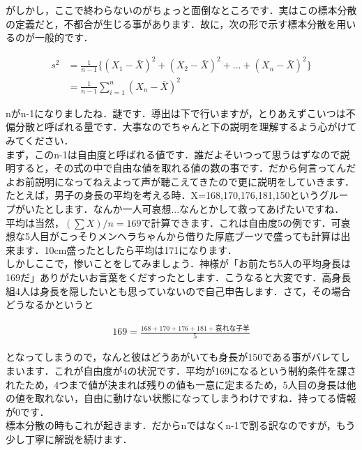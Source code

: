 \documentclass[11pt,a4paper,uplatex]{ujreport} 	%
\begin{document}
がしかし，ここで終わらないのがちょっと面倒なところです．実はこの標本分散の定義だと，不都合が生じる事があります．故に，次の形で示す標本分散を用いるのが一般的です．

\begin{align}
  s^2 &= \frac{1}{n-1}\{ (X_1-\bar{X})^2 + (X_2-\bar{X})^2 + ...+(X_n - \bar{X})^2 \}\\
      &= \frac{1}{n-1} \sum_{i=1}^n(X_n - \bar{X})^2
\end{align}

nがn-1になりましたね．謎です．導出は下で行いますが，とりあえずこいつは不偏分散と呼ばれる量です．大事なのでちゃんと下の説明を理解するよう心がけてみてください．\\

まず，このn-1は自由度と呼ばれる値です．誰だよそいつって思うはずなので説明すると，その式の中で自由な値を取れる値の数の事です．だから何言ってんだよお前説明になってねえよって声が聴こえてきたので更に説明をしていきます．\\

たとえば，男子の身長の平均を考える時．X={168,170,176,181,150}というグループがいたとします．なんか一人可哀想...なんとかして救ってあげたいですね．\\

平均は当然，$(\sum X) /n= 169$で計算できます．これは自由度5の例です．可哀想な5人目がこっそりメンヘラちゃんから借りた厚底ブーツで盛っても計算は出来ます．10cm盛ったとしたら平均は171になります．\\

しかしここで，惨いことをしてみましょう．神様が「お前たち5人の平均身長は169だ」ありがたいお言葉をくだすったとします．こうなると大変です．高身長組4人は身長を隠したいとも思っていないので自己申告します．さて，その場合どうなるかというと

\begin{align}
  169 = \frac{168+170+176+181+\text{哀れな子羊}}{5}
\end{align}

となってしまうので，なんと彼はどうあがいても身長が150である事がバレてしまいます．これが自由度が4の状況です．平均が169になるという制約条件を課されたため，4つまで値が決まれば残りの値も一意に定まるため，5人目の身長は他の値を取れない，自由に動けない状態になってしまうわけですね．持ってる情報が0です．\\

標本分散の時もこれが起きます．だからnではなくn-1で割る訳なのですが，もう少し丁寧に解説を続けます．\\
\end{document}
